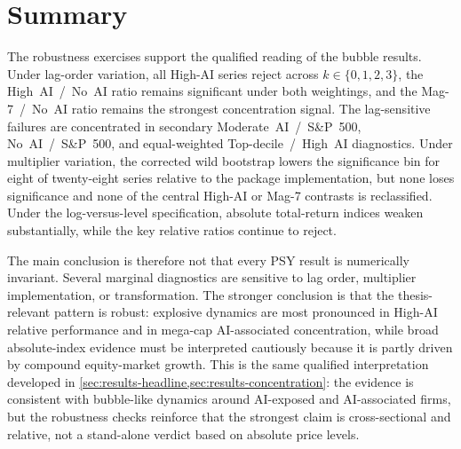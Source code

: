 \section{Summary}
\label{sec:rob-summary}

The robustness exercises support the qualified reading of the bubble results. Under lag-order variation, all High-AI series reject across $k\in\{0,1,2,3\}$, the High~AI~/~No~AI ratio remains significant under both weightings, and the Mag-7~/~No~AI ratio remains the strongest concentration signal. The lag-sensitive failures are concentrated in secondary Moderate~AI~/~S\&P~500, No~AI~/~S\&P~500, and equal-weighted Top-decile~/~High~AI diagnostics. Under multiplier variation, the corrected wild bootstrap lowers the significance bin for eight of twenty-eight series relative to the package implementation, but none loses significance and none of the central High-AI or Mag-7 contrasts is reclassified. Under the log-versus-level specification, absolute total-return indices weaken substantially, while the key relative ratios continue to reject.

The main conclusion is therefore not that every PSY result is numerically invariant. Several marginal diagnostics are sensitive to lag order, multiplier implementation, or transformation. The stronger conclusion is that the thesis-relevant pattern is robust: explosive dynamics are most pronounced in High-AI relative performance and in mega-cap AI-associated concentration, while broad absolute-index evidence must be interpreted cautiously because it is partly driven by compound equity-market growth. This is the same qualified interpretation developed in \cref{sec:results-headline,sec:results-concentration}: the evidence is consistent with bubble-like dynamics around AI-exposed and AI-associated firms, but the robustness checks reinforce that the strongest claim is cross-sectional and relative, not a stand-alone verdict based on absolute price levels.

